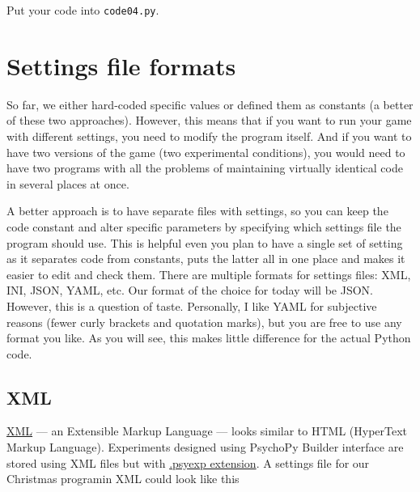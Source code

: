 \documentclass[
]{book}
\begin{document}
Put your code into \texttt{code04.py}.

\hypertarget{settings-files}{%
\section{Settings file formats}\label{settings-files}}

So far, we either hard-coded specific values or defined them as constants (a better of these two approaches). However, this means that if you want to run your game with different settings, you need to modify the program itself. And if you want to have two versions of the game (two experimental conditions), you would need to have two programs with all the problems of maintaining virtually identical code in several places at once.

A better approach is to have separate files with settings, so you can keep the code constant and alter specific parameters by specifying which settings file the program should use. This is helpful even you plan to have a single set of setting as it separates code from constants, puts the latter all in one place and makes it easier to edit and check them. There are multiple formats for settings files: XML, INI, JSON, YAML, etc. Our format of the choice for today will be JSON. However, this is a question of taste. Personally, I like YAML for subjective reasons (fewer curly brackets and quotation marks), but you are free to use any format you like. As you will see, this makes little difference for the actual Python code.

\hypertarget{xml}{%
\subsection{XML}\label{xml}}

\href{https://en.wikipedia.org/wiki/XML}{XML} --- an Extensible Markup Language --- looks similar to HTML (HyperText Markup Language). Experiments designed using PsychoPy Builder interface are stored using XML files but with \href{https://www.psychopy.org/psyexp.html}{.psyexp extension}. A settings file for our Christmas programin XML could look like this
\end{document}
